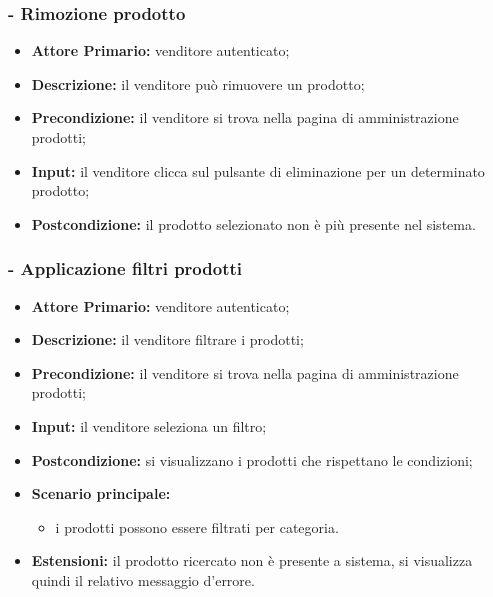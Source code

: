 \stepsubUserCase
\subsubsection{- Rimozione prodotto}
\begin{itemize}
    \item \textbf{Attore Primario:} venditore autenticato;
    \item \textbf{Descrizione:} il venditore può rimuovere un prodotto;
    \item \textbf{Precondizione:} il venditore si trova nella pagina di amministrazione prodotti;
    \item \textbf{Input:} il venditore clicca sul pulsante di eliminazione per un determinato prodotto;
    \item \textbf{Postcondizione:} il prodotto selezionato non è più presente nel sistema.
\end{itemize}

\stepsubUserCase
\subsubsection{- Applicazione filtri prodotti}
\begin{itemize}
    \item \textbf{Attore Primario:} venditore autenticato;
    \item \textbf{Descrizione:} il venditore filtrare i prodotti;
    \item \textbf{Precondizione:} il venditore si trova nella pagina di amministrazione prodotti;
    \item \textbf{Input:} il venditore seleziona un filtro;
    \item \textbf{Postcondizione:} si visualizzano i prodotti che rispettano le condizioni;
    \item \textbf{Scenario principale:}
    \begin{itemize}
        \item i prodotti possono essere filtrati per categoria.
    \end{itemize}
    \item \textbf{Estensioni:} il prodotto ricercato non è presente a sistema, si visualizza quindi il relativo messaggio d'errore.
\end{itemize}

\stepsubUserCase
